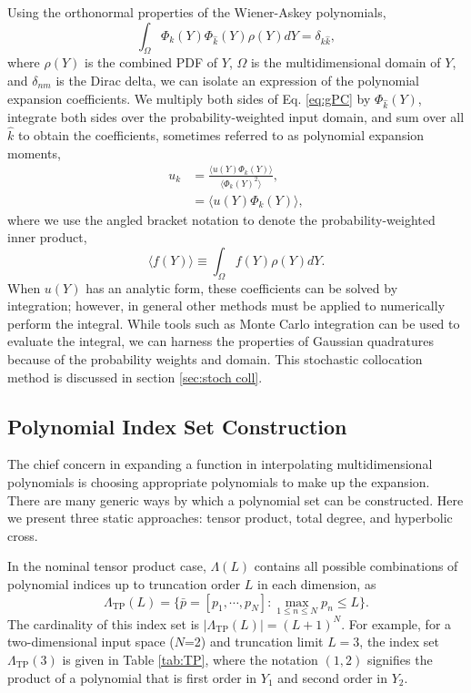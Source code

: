 Using the orthonormal properties of the Wiener-Askey polynomials,
\begin{equation}
  \int_\Omega \Phi_k(Y)\Phi_{\hat k}(Y) \rho(Y) dY = \delta_{k\hat k},
\end{equation}
where $\rho(Y)$ is the combined PDF of $Y$, $\Omega$ is the multidimensional domain of $Y$, and $\delta_{nm}$
is the Dirac delta, we can isolate an expression of the polynomial expansion coefficients.
We multiply both sides of Eq. \ref{eq:gPC} by
$\Phi_{\hat k}(Y)$, integrate both sides over the probability-weighted input domain, and sum over all $\hat k$
to obtain the coefficients, sometimes referred to as polynomial expansion moments,
\begin{align}\label{eq:polycoeff}
  u_k &= \frac{\langle u(Y)\Phi_k(Y) \rangle}{\langle \Phi_k(Y)^2 \rangle},\\
      &= \langle u(Y)\Phi_k(Y) \rangle,
\end{align}
where we use the angled bracket notation to denote the probability-weighted inner product,
\begin{equation}
  \langle f(Y) \rangle \equiv \int_\Omega f(Y)\rho(Y) dY.
\end{equation}
When $u(Y)$ has an analytic form, these coefficients can be solved by integration; however, in general other
methods must be applied to numerically perform the integral.  While tools such as Monte Carlo integration can
be used to evaluate the integral, we can harness the properties of Gaussian quadratures because of the
probability weights and domain.  This stochastic collocation method is discussed in section \ref{sec:stoch
coll}.


\subsection{Polynomial Index Set Construction}\label{sec:index sets}
The chief concern in expanding a function in interpolating multidimensional polynomials is choosing appropriate polynomials to
make up the expansion.
There are many generic ways by which a polynomial set can be constructed.  Here we present three static
approaches: tensor
product, total degree, and hyperbolic cross.

In the nominal tensor
product case, $\Lambda(L)$ contains all possible combinations of polynomial indices up to truncation order $L$ in each
dimension, as
\begin{equation}
  \Lambda_\text{TP}(L)=\Big\{\bar p=[p_1,\cdots,p_N]: \max_{1\leq n\leq N}p_n\leq L
\Big\}.
\end{equation}
The cardinality of this index set is $|\Lambda_\text{TP}(L)|=(L+1)^N$. For example, for a two-dimensional
input space ($N$=2) and truncation limit $L=3$, the index set $\Lambda_\text{TP}(3)$ is given in Table
\ref{tab:TP}, where the notation $(1,2)$ signifies the product of a polynomial that is first order in $Y_1$
and second order in $Y_2$.

